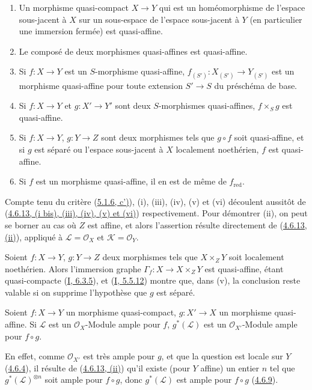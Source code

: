 \begin{proposition}[5.1.10]
\label{II.5.1.10-fr}
\begin{enumerate}
  \item[\rm{(i)}] Un morphisme quasi-compact $X\to Y$ qui est un
  homéomorphisme de l'espace sous-jacent à $X$ sur un sous-espace de
  l'espace sous-jacent à $Y$ (en particulier une immersion fermée) est
  quasi-affine.
  \item[\rm{(ii)}] Le composé de deux morphismes quasi-affines est
  quasi-affine.
  \item[\rm{(iii)}] Si $f:X\to Y$ est un $S$-morphisme quasi-affine,
  $f_{(S')}:X_{(S')}\to Y_{(S')}$ est un morphisme quasi-affine pour toute
  extension $S'\to S$ du préschéma de base.
  \item[\rm{(iv)}] Si $f:X\to Y$ et $g:X'\to Y'$ sont deux $S$-morphismes
  quasi-affines, $f\times_S g$ est quasi-affine.
  \item[\rm{(v)}] Si $f:X\to Y$, $g:Y\to Z$ sont deux morphismes tels que
  $g\circ f$ soit quasi-affine, et si $g$ est séparé ou l'espace sous-jacent
  à $X$ localement noethérien, $f$ est quasi-affine.
  \item[\rm{(vi)}] Si $f$ est un morphisme quasi-affine, il en est de même
  de $f_{\mathrm{red}}$.
\end{enumerate}
\end{proposition}

Compte tenu du critère (\hyperref[II.5.1.6-fr]{5.1.6, c')}), (i), (iii),
(iv), (v) et (vi) découlent aussitôt de
(\hyperref[II.4.6.13-fr]{4.6.13, (i bis), (iii), (iv), (v) et (vi)})
respectivement. Pour démontrer (ii), on peut se borner au cas où $Z$ est
affine, et alors l'assertion résulte directement de
(\hyperref[II.4.6.13-fr]{4.6.13, (ii)}), appliqué à
$\mathcal{L}=\mathcal{O}_X$ et $\mathcal{K}=\mathcal{O}_Y$.

\begin{remark}[5.1.11]
\label{II.5.1.11-fr}
Soient $f:X\to Y$, $g:Y\to Z$ deux morphismes tels que $X\times_ZY$ soit
localement noethérien. Alors l'immersion graphe
$\Gamma_f:X\to X\times_ZY$ est quasi-affine, étant quasi-compacte
(\hyperref[I.6.3.5-fr]{I, 6.3.5}), et
(\hyperref[I.5.5.12-fr]{I, 5.5.12}) montre que, dans (v), la conclusion reste
valable si on supprime l'hypothèse que $g$ est séparé.
\end{remark}

\begin{proposition}[5.1.12]
\label{II.5.1.12-fr}
Soient $f:X\to Y$ un morphisme quasi-compact, $g:X'\to X$ un morphisme
quasi-affine. Si $\mathcal{L}$ est un $\mathcal{O}_X$-Module ample pour
$f$, $g^*(\mathcal{L})$ est un $\mathcal{O}_{X'}$-Module ample pour
$f\circ g$.
\end{proposition}

En effet, comme $\mathcal{O}_{X'}$ est très ample pour $g$, et que la
question est locale sur $Y$ (\hyperref[II.4.6.4-fr]{4.6.4}), il résulte de
(\hyperref[II.4.6.13-fr]{4.6.13, (ii)}) qu'il existe (pour $Y$ affine) un
entier $n$ tel que $g^*(\mathcal{L})^{\otimes n}$ soit ample pour
$f\circ g$, donc $g^*(\mathcal{L})$ est ample pour $f\circ g$
(\hyperref[II.4.6.9-fr]{4.6.9}).

